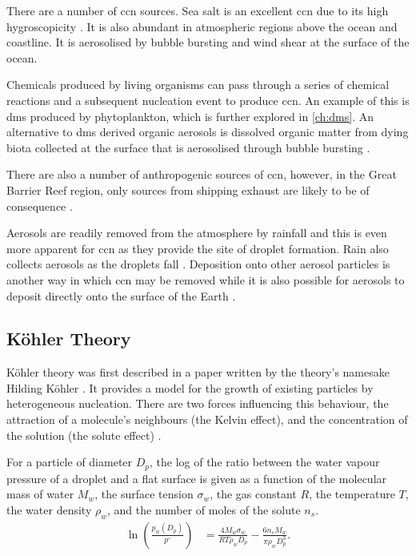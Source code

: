 		There are a number of \gls{ccn} sources. Sea salt is an excellent \gls{ccn} due to its high hygroscopicity \citep{randles:2004ke}. It is also abundant in atmospheric regions above the ocean and coastline. It is aerosolised by bubble bursting and wind shear at the surface of the ocean. 

		Chemicals produced by living organisms can pass through a series of chemical reactions and a subsequent nucleation event to produce \gls{ccn}. An example of this is \gls{dms} produced by phytoplankton, which is further explored in \cref{ch:dms}. An alternative to \gls{dms} derived organic aerosols is dissolved organic matter from dying biota collected at the surface that is aerosolised through bubble bursting \citep{bigg:2007er}. 
		
		There are also a number of anthropogenic sources of \gls{ccn}, however, in the Great Barrier Reef region, only sources from shipping exhaust are likely to be of consequence \citep{fischer2012atmospheric}.

		Aerosols are readily removed from the atmosphere by rainfall and this is even more apparent for \gls{ccn} as they provide the site of droplet formation. Rain also collects aerosols as the droplets fall \citep{rogers1989short}. Deposition onto other aerosol particles is another way in which \gls{ccn} may be removed while it is also possible for aerosols to deposit directly onto the surface of the Earth \citep[Chapter 9]{seinfeld2012atmospheric}.

		\subsection{K\"{o}hler Theory}
		\label{subsec:kohler}
			K\"{o}hler theory was first described in a paper written by the theory's namesake Hilding K\"{o}hler \citep{kohler:1936dq}. It provides a model for the growth of existing particles by heterogeneous nucleation. There are two forces influencing this behaviour, the attraction of a molecule's neighbours (the Kelvin effect), and the concentration of the solution (the solute effect) \citep{rogers1989short}.

			For a particle of diameter $D_p$, the log of the ratio between the water vapour pressure of a droplet and a flat surface is given as a function of the molecular mass of water $M_w$, the surface tension $\sigma_w$, the gas constant $R$, the temperature $T$, the water density $\rho_w$, and the number of moles of the solute $n_s$.
			\begin{align}
				\ln \left(\frac{p_w(D_p)}{p^\circ}\right) &= \frac{4 M_w \sigma_w}{R T \rho_w D_p} - \frac{6 n_s M_w}{\pi \rho_w D_p^3}.
				\label{eq:kohler}
			\end{align}

